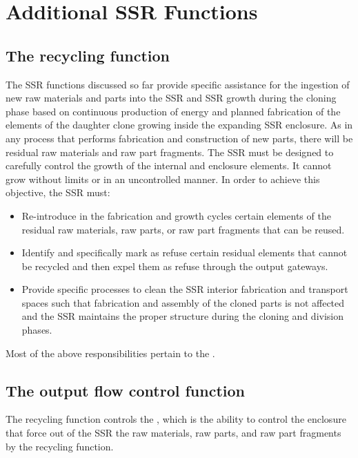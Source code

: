 \section{Additional SSR Functions}

\subsection[The recycling function]{The recycling function}

The SSR functions discussed so
far provide specific assistance for the ingestion of new raw
materials and parts into the SSR and SSR growth during the cloning phase
based on continuous production of energy and planned
fabrication of the elements of the daughter clone growing inside the
expanding SSR enclosure. As in any process that performs fabrication
and construction of new parts, there will be residual raw materials
and raw part fragments.  The SSR must be designed to carefully control
the growth of the internal and enclosure elements. It cannot
grow without limits or in an uncontrolled manner. In order to achieve
this objective, the SSR must:

\begin{itemize}
\item Re-introduce in the fabrication and growth cycles certain elements
of the residual raw materials, raw parts, or raw part fragments that
can be reused.
\item Identify and specifically mark as refuse certain residual elements
that cannot be recycled and then expel them as refuse through the
output gateways.
\item Provide specific processes to clean the SSR
interior fabrication and transport spaces such that fabrication and
assembly of the cloned parts is not affected and the SSR
maintains the proper structure during the cloning and division phases.
\end{itemize}

Most of the above responsibilities pertain to the .

\subsection[The output flow control function]{The output flow control
function}

The recycling function controls
the , which is the ability to
control the enclosure  that force out of the SSR
the raw materials, raw parts, and raw part fragments  
by the recycling function.

